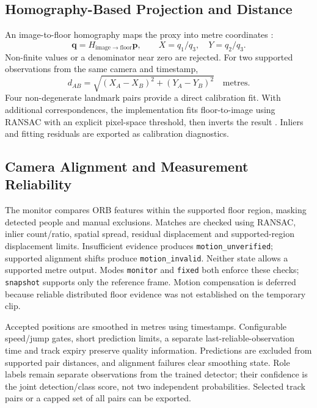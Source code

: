 \subsection{Homography-Based Projection and Distance}
An image-to-floor homography maps the proxy into metre coordinates \cite{hartley2004multiple,opencvHomography}:
\begin{equation}
\mathbf{q}=H_{\mathrm{image}\rightarrow\mathrm{floor}}\mathbf{p},\qquad
X=q_1/q_3,\quad Y=q_2/q_3.
\label{eq:floor-project}
\end{equation}
Non-finite values or a denominator near zero are rejected. For two supported observations from the same camera and timestamp,
\begin{equation}
d_{AB}=\sqrt{(X_A-X_B)^2+(Y_A-Y_B)^2}\quad\text{metres}.
\label{eq:floor-distance}
\end{equation}
Four non-degenerate landmark pairs provide a direct calibration fit. With additional correspondences, the implementation fits floor-to-image using RANSAC with an explicit pixel-space threshold, then inverts the result \cite{fischler1981ransac}. Inliers and fitting residuals are exported as calibration diagnostics.

\subsection{Camera Alignment and Measurement Reliability}
The monitor compares ORB features \cite{rublee2011orb} within the supported floor region, masking detected people and manual exclusions. Matches are checked using RANSAC, inlier count/ratio, spatial spread, residual displacement and supported-region displacement limits. Insufficient evidence produces \texttt{motion\_unverified}; supported alignment shifts produce \texttt{motion\_invalid}. Neither state allows a supported metre output. Modes \texttt{monitor} and \texttt{fixed} both enforce these checks; \texttt{snapshot} supports only the reference frame. Motion compensation is deferred because reliable distributed floor evidence was not established on the temporary clip.

Accepted positions are smoothed in metres using timestamps. Configurable speed/jump gates, short prediction limits, a separate last-reliable-observation time and track expiry preserve quality information. Predictions are excluded from supported pair distances, and alignment failures clear smoothing state. Role labels remain separate observations from the trained detector; their confidence is the joint detection/class score, not two independent probabilities. Selected track pairs or a capped set of all pairs can be exported.

